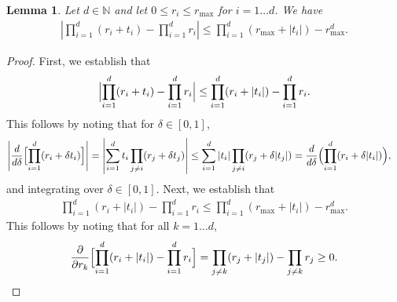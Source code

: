 \documentclass[11pt]{article}
\newtheorem{lemma}[theorem]{Lemma}
\newcommand{\Aplus}[1]{A_{+, #1}}
\newcommand{\Apx}{\Aplus{x}}
\newcommand{\indax}{1_{a_i \cdot x > 0}}
\newcommand{\inday}{1_{a_i \cdot y > 0}}
\newcommand{\ai}{a_i}
\newcommand{\rmax}{r_{\text{max}}}
\newcommand{\bigPioned}{\prod_{i=1}^d}
\DeclareMathOperator{\diag}{diag}
\begin{document}
\begin{lemma} \label{lemma:piritiri} 
Let $d \in \mathbb{N}$ and let $0 \leq r_i \leq \rmax$ for $i = 1 \ldots d$. We have
\begin{align*}
\left |  \prod_{i=1}^d (r_i + t_i)  -  \prod_{i=1}^d r_i \right |  \leq  \prod_{i=1}^d (\rmax + |t_i|) - \rmax^d.
\end{align*}
\end{lemma}
\begin{proof}
First, we establish that 
\begin{align*}
\Bigl | \bigPioned (r_i + t_i) - \bigPioned r_i \Bigr | \leq \bigPioned (r_i+ |t_i|) - \bigPioned r_i.
\end{align*}
This follows by noting that for $\delta \in [0,1]$, 
\begin{align*}
\left | \frac{d}{d\delta} \Bigl[ \prod_{i=1}^d (r_i + \delta t_i)   \Bigr]    \right| &= \left| \sum_{i=1}^d t_i  \prod_{j \neq i} (r_j + \delta t_j)    \right | 
\leq \sum_{i=1}^d |t_i| \prod_{j \neq i}  (r_j + \delta |t_j|)  
= \frac{d}{d \delta} \Bigl( \prod_{i=1}^d (r_i + \delta |t_i|)  \Bigr),
\end{align*}
and integrating over $\delta \in [0,1]$.  
Next, we establish that
\begin{align*}
\bigPioned (r_i+ |t_i|) - \bigPioned r_i \leq \bigPioned (\rmax + |t_i|) - \rmax^d.
\end{align*}
This follows by noting that for all $k = 1 \ldots d$,
\begin{align*}
\frac{\partial}{\partial r_k} \Bigl[ \bigPioned (r_i + |t_i|) - \bigPioned r_i \Bigr] = \prod_{j \neq k} (r_j + |t_j|) - \prod_{j \neq k} r_j \geq 0.
\end{align*}
\end{proof}



\end{document}

